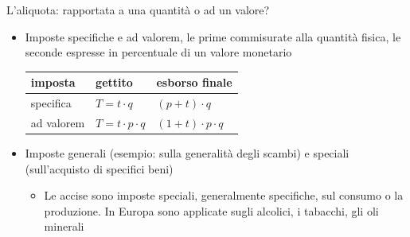 \documentclass[aspectratio=64,11pt]{beamer}
\begin{document}
\begin{frame}{L'aliquota: rapportata a una quantità o ad un valore?}
\begin{itemize}
\item Imposte \alert{specifiche} e \alert{ad valorem}, le prime commisurate alla quantità
fisica, le seconde espresse in percentuale di un valore monetario
\begin{center}
\begin{tabular}{lll}
imposta & gettito & esborso finale\\[0pt]
\hline
specifica & $T = t\cdot q$ & $(p+t)\cdot q$\\[0pt]
ad valorem & $T = t\cdot p\cdot q$ & $(1+t)\cdot p\cdot q$\\[0pt]
\end{tabular}
\end{center}
\item Imposte \alert{generali} (esempio: sulla generalità degli scambi) e \alert{speciali}
(sull'acquisto di specifici beni)
\begin{itemize}
\item Le \alert{accise} sono imposte speciali, generalmente specifiche, sul consumo o
la produzione. In Europa sono applicate sugli alcolici, i tabacchi, gli
oli minerali
\end{itemize}
\end{itemize}
\end{frame}
\end{document}
